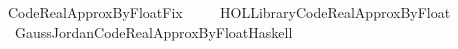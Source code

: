 %
\begin{isabellebody}%
%
%
\isadelimtheory
%
\endisadelimtheory
%
\isatagtheory
{}\isamarkupfalse%
\ Code{\isacharunderscore}{\kern0pt}Real{\isacharunderscore}{\kern0pt}Approx{\isacharunderscore}{\kern0pt}By{\isacharunderscore}{\kern0pt}Float{\isacharunderscore}{\kern0pt}Fix\isanewline
\ \ \isanewline
\ \ {\isachardoublequoteopen}HOL{\isacharminus}{\kern0pt}Library{\isachardot}{\kern0pt}Code{\isacharunderscore}{\kern0pt}Real{\isacharunderscore}{\kern0pt}Approx{\isacharunderscore}{\kern0pt}By{\isacharunderscore}{\kern0pt}Float{\isachardoublequoteclose}\isanewline
\ \ {\isachardoublequoteopen}Gauss{\isacharunderscore}{\kern0pt}Jordan{\isachardot}{\kern0pt}Code{\isacharunderscore}{\kern0pt}Real{\isacharunderscore}{\kern0pt}Approx{\isacharunderscore}{\kern0pt}By{\isacharunderscore}{\kern0pt}Float{\isacharunderscore}{\kern0pt}Haskell{\isachardoublequoteclose}\isanewline
{}%
\endisatagtheory
{\isafoldtheory}%
%
\isadelimtheory
%
\endisadelimtheory
%
\isadelimdocument
%
\endisadelimdocument
%
\isatagdocument
%
\endisatagdocument
{\isafolddocument}%
%
\isadelimdocument
%
\endisadelimdocument
%
\isadelimtheory
%
\endisadelimtheory
%
\isatagtheory
{}\isamarkupfalse%
%
\endisatagtheory
{\isafoldtheory}%
%
\isadelimtheory
%
\endisadelimtheory
%
\end{isabellebody}%
\endinput
